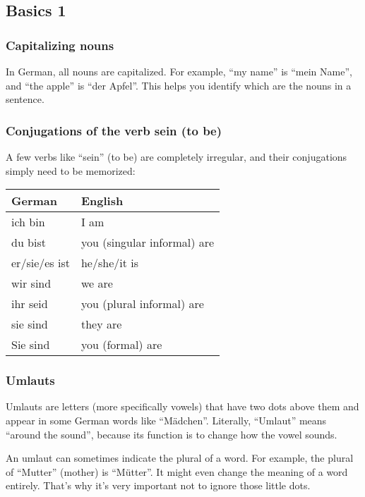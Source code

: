 \subsection{Basics 1}

\subsubsection{Capitalizing nouns}

In German, all nouns are capitalized. For example, ``my name'' is ``mein Name'', and ``the apple'' is ``der Apfel''.  This helps you identify which are the nouns in a sentence.

\subsubsection{Conjugations of the verb sein (to be)}

A few verbs like ``sein'' (to be) are completely irregular, and their conjugations simply need to be memorized:

\begin{center}\begin{tabular}{l|l}
  \textbf{German} & \textbf{English} \\
	\hline
	ich bin & I am \\
	\hline
	du bist & you (singular informal) are \\
	\hline
	er/sie/es ist & he/she/it is \\
	\hline
	wir sind & we are \\
	\hline
	ihr seid & you (plural informal) are \\
	\hline
	sie sind & they are \\
	\hline
	Sie sind & you (formal) are
\end{tabular}\end{center}

\subsubsection{Umlauts}

Umlauts are letters (more specifically vowels) that have two dots above them and appear in some German words like ``M{\"a}dchen''. Literally, ``Umlaut'' means ``around the sound'', because its function is to change how the vowel sounds.

An umlaut can sometimes indicate the plural of a word. For example, the plural of ``Mutter'' (mother) is ``M{\"u}tter''. It might even change the meaning of a word entirely. That's why it's very important not to ignore those little dots.

